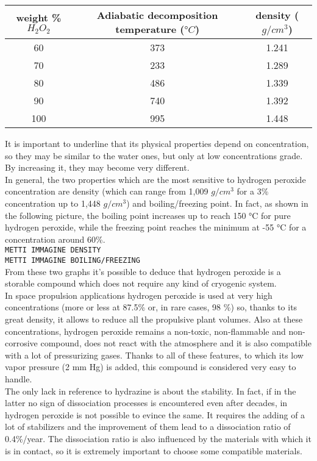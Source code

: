 \documentclass[a4paper]{report}
\begin{document}
\begin{center}
\begin{tabular}{c c c}
\hline
weight \% $H_2O_2$ & Adiabatic decomposition temperature ($°C$) & density ($g/cm^3$)\\
\hline 
60 & 373 & 1.241\\
\hline 
70 & 233 & 1.289\\
\hline 
80 & 486 & 1.339\\
\hline 
90 & 740 & 1.392\\
\hline 
100 & 995 & 1.448\\
\hline
\end{tabular}
\end{center}

\vspace{0.3 cm}
It is important to underline that its physical properties depend on concentration, so they may be similar to the water ones, but only at low concentrations grade. By increasing it, they may become very different.\\ 
In general, the two properties which are the most sensitive to hydrogen peroxide concentration are density (which can range from 1,009 $g/cm^3$ for a 3\% concentration up to 1,448 $g/cm^3$) and boiling/freezing point. In fact, as shown in the following picture, the boiling point increases up to reach 150 °C for pure hydrogen peroxide, while the freezing point reaches the minimum at -55 °C for a concentration around 60\%. \\ 
\texttt{\color{red}METTI IMMAGINE DENSITY}\\
\texttt{\color{red}METTI IMMAGINE BOILING/FREEZING}\\
From these two graphs it's possible to deduce that hydrogen peroxide is a storable compound which does not require any kind of cryogenic system.\\
In space propulsion applications hydrogen peroxide is used at very high concentrations (more or less at 87.5\% or, in rare cases, 98 \%) so, thanks to its great density, it allows to reduce all the propulsive plant volumes. Also at these concentrations, hydrogen peroxide remains a non-toxic, non-flammable and non-corrosive compound, does not react with the atmosphere and it is also compatible with a lot of pressurizing gases. Thanks to all of these features, to which its low vapor pressure (2 mm Hg) is added, this compound is considered very easy to handle. \\ 
The only lack in reference to hydrazine is about the stability. In fact, if in the latter no sign of dissociation processes is encountered even after decades, in hydrogen peroxide is not possible to evince the same. It requires the adding of a lot of stabilizers and the improvement of them lead to a dissociation ratio of  0.4\%/year. The dissociation ratio is also influenced by the materials with which it is in contact, so it is extremely important to choose some compatible materials.\\ %
\end{document}
